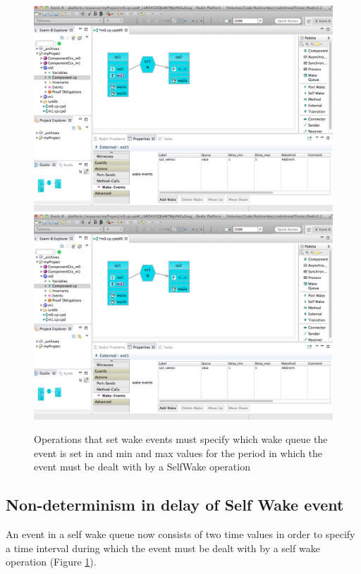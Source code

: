 \begin{figure}[!htbp]
  \centering
  \ifplastex
  \includegraphics[width=1024]{figures/image58.png}
  \else
  \includegraphics[width=1\textwidth]{figures/image58.png}
  \fi
  \caption{Operations that set wake events must specify which wake queue the event is set in and min and max values for the period in which the event must be dealt with by a SelfWake operation}
  \label{fig:OperationsThatSetWakeEventsMustSpecifyWhichWakeQueueTheEventIsSetIn}
\end{figure}

\subsection{Non-determinism in delay of Self Wake event}
An event in a self wake queue now consists of two time values in order to specify a time interval during which the event must be dealt with by a self wake operation (Figure \ref{fig:OperationsThatSetWakeEventsMustSpecifyWhichWakeQueueTheEventIsSetIn}).

